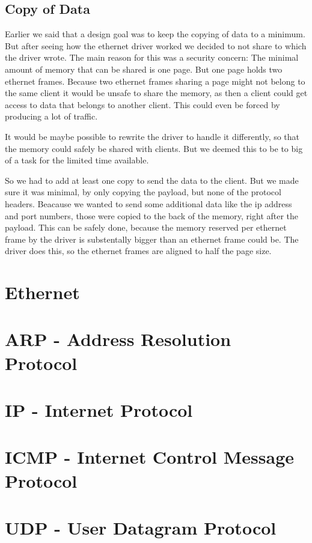 \subsection{Copy of Data}
Earlier we said that a design goal was to keep the copying of data to a minimum. But after seeing how the ethernet driver worked we decided to not share to which the driver wrote. The main reason for this was a security concern: The minimal amount of memory that can be shared is one page. But one page holds two ethernet frames. Because two ethernet frames sharing a page might not belong to the same client it would be unsafe to share the memory, as then a client could get access to data that belongs to another client. This could even be forced by producing a lot of traffic.

It would be maybe possible to rewrite the driver to handle it differently, so that the memory could safely be shared with clients. But we deemed this to be to big of a task for the limited time available.

So we had to add at least one copy to send the data to the client. But we made sure it was minimal, by only copying the payload, but none of the protocol headers. Beacause we wanted to send some additional data like the ip address and port numbers, those were copied to the back of the memory, right after the payload. This can be safely done, because the memory reserved per ethernet frame by the driver is substentally bigger than an ethernet frame could be. The driver does this, so the ethernet frames are aligned to half the page size.

\section{Ethernet}

\section{ARP - Address Resolution Protocol}

\section{IP - Internet Protocol}

\section{ICMP - Internet Control Message Protocol}

\section{UDP - User Datagram Protocol}

